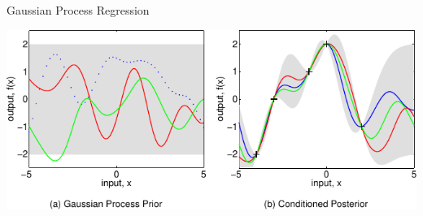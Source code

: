 \documentclass[10pt, compress, aspectratio=169, xcolor={table,usenames,dvipsnames}]{beamer}
\begin{document}
\begin{frame}[label={sec:orgb6c869a}]{Gaussian Process Regression}
\begin{center}
\includegraphics[width=.95\columnwidth]{../../../img/rasmussen_prior_posterior.pdf}
\end{center}

\end{frame}
\end{document}
